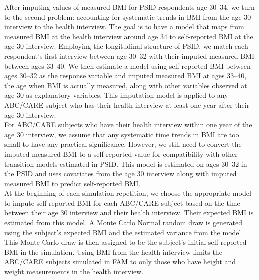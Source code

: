 \noindent After imputing values of measured BMI for PSID respondents age 30--34, we turn to the second problem: accounting for systematic trends in BMI from the age 30 interview to the health interview.  The goal is to have a model that maps from measured BMI at the health interview around age 34 to self-reported BMI at the age 30 interview.  Employing the longitudinal structure of PSID, we match each respondent's first interview between age 30--32 with their imputed measured BMI between ages 33--40.  We then estimate a model using self-reported BMI between ages 30--32 as the response variable and imputed measured BMI at ages 33--40, the age when BMI is actually measured, along with other variables observed at age 30 as explanatory variables. This imputation model is applied to any ABC/CARE subject who has their health interview at least one year after their age 30 interview.\\

\noindent For ABC/CARE subjects who have their health interview within one year of the age 30 interview, we assume that any systematic time trends in BMI are too small to have any practical significance.  However, we still need to convert the imputed measured BMI to a self-reported value for compatibility with other transition models estimated in PSID.  This model is estimated on ages 30--32 in the PSID and uses covariates from the age 30 interview along with imputed measured BMI to predict self-reported BMI. \\

\noindent At the beginning of each simulation repetition, we choose the appropriate model to impute self-reported BMI for each ABC/CARE subject based on the time between their age 30 interview and their health interview. Their expected BMI is estimated from this model. A Monte Carlo Normal random draw is generated using the subject's expected BMI and the estimated variance from the model. This Monte Carlo draw is then assigned to be the subject's initial self-reported BMI in the simulation. Using BMI from the health interview limits the ABC/CARE subjects simulated in FAM to only those who have height and weight measurements in the health interview. \\

